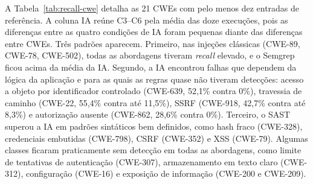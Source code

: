 A Tabela~\ref{tab:recall-cwe} detalha as 21 CWEs com pelo menos dez entradas
de referência. A coluna IA reúne C3--C6 pela média das doze execuções, pois as
diferenças entre as quatro condições de IA foram pequenas diante das diferenças
entre CWEs. Três padrões aparecem. Primeiro, nas injeções clássicas
(CWE-89, CWE-78, CWE-502), todas as abordagens tiveram \textit{recall} elevado,
e o Semgrep ficou acima da média da IA. Segundo, a IA encontrou falhas que
dependem da lógica da aplicação e para as quais as regras quase não tiveram
detecções: acesso a objeto por identificador controlado (CWE-639, 52,1\% contra
0\%), travessia de caminho (CWE-22, 55,4\% contra até 11,5\%), SSRF (CWE-918,
42,7\% contra até 8,3\%) e autorização ausente (CWE-862, 28,6\% contra 0\%).
Terceiro, o SAST superou a IA em padrões sintáticos bem definidos, como hash
fraco (CWE-328), credenciais embutidas (CWE-798), CSRF (CWE-352) e XSS (CWE-79).
Algumas classes ficaram praticamente sem detecção em todas as abordagens, como
limite de tentativas de autenticação (CWE-307), armazenamento em texto claro
(CWE-312), configuração (CWE-16) e exposição de informação (CWE-200 e CWE-209).

